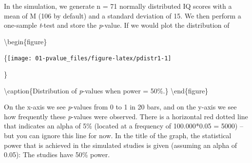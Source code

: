 \documentclass[
]{krantz}
\newenvironment{Shaded}{\begin{snugshade}}{\end{snugshade}}
\newcommand{\AttributeTok}[1]{\textcolor[rgb]{0.77,0.63,0.00}{#1}}
\newcommand{\CommentTok}[1]{\textcolor[rgb]{0.56,0.35,0.01}{\textit{#1}}}
\newcommand{\ControlFlowTok}[1]{\textcolor[rgb]{0.13,0.29,0.53}{\textbf{#1}}}
\newcommand{\DecValTok}[1]{\textcolor[rgb]{0.00,0.00,0.81}{#1}}
\newcommand{\FloatTok}[1]{\textcolor[rgb]{0.00,0.00,0.81}{#1}}
\newcommand{\FunctionTok}[1]{\textcolor[rgb]{0.00,0.00,0.00}{#1}}
\newcommand{\NormalTok}[1]{#1}
\newcommand{\OtherTok}[1]{\textcolor[rgb]{0.56,0.35,0.01}{#1}}
\newcommand{\SpecialCharTok}[1]{\textcolor[rgb]{0.00,0.00,0.00}{#1}}
\begin{document}
\begin{Shaded}
\end{Shaded}

In the simulation, we generate n = 71 normally distributed IQ scores with a mean of M (106 by default) and a standard deviation of 15. We then perform a one-sample \emph{t}-test and store the \emph{p}-value. If we would plot the distribution of

\textbackslash begin\{figure\}

\{\centering \texttt{[image: 01-pvalue\_files/figure-latex/pdistr1-1]}

\}

\textbackslash caption\{Distribution of \emph{p}-values when power = 50\%.\}\label{fig:pdistr1}
\textbackslash end\{figure\}

On the x-axis we see \emph{p}-values from 0 to 1 in 20 bars, and on the y-axis we see how frequently these \emph{p}-values were observed. There is a horizontal red dotted line that indicates an alpha of 5\% (located at a frequency of 100.000*0.05 = 5000) -- but you can ignore this line for now. In the title of the graph, the statistical power that is achieved in the simulated studies is given (assuming an alpha of 0.05): The studies have 50\% power.
\end{document}
